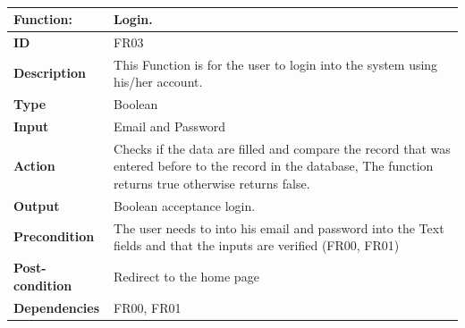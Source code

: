\documentclass[]{article}
\begin{document}
\FloatBarrier
\begin{table}[h]
\caption{ }
\label{tab:my-table}
\begin{tabular}{|p{}|p{}|}
\hline
\textbf{Function:} & Login.
\\ \hline
\textbf{ID}  &    FR03        

\\ \hline
\textbf{Description}    &       This Function is for the user to login into the system using his/her account.                                                              
\\ \hline
\textbf{Type}    &         Boolean

\\ \hline
\textbf{Input}        & Email and Password


\\ \hline
\textbf{Action}            & Checks if the data are filled and compare the record that was entered before to the record in the database, The function returns true otherwise returns false.

\\ \hline
\textbf{Output}            & Boolean acceptance login.

\\ \hline
\textbf{Precondition}           &   The user needs to into his email and password into the Text fields and that the inputs are verified (FR00, FR01)

\\ \hline
\textbf{Post-condition}           & Redirect to the home page


\\ \hline
\textbf{Dependencies}           & FR00, FR01
\\ \hline
\end{tabular}
\end{table}
\end{document}
